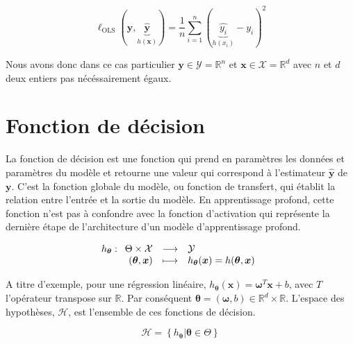 \begin{equation}
    \ell_{\text{OLS}}(\boldsymbol{y}, \underbrace{\hat{\boldsymbol{y}}}_{h(\boldsymbol{x})}) = \frac{1}{n}\sum_{i=1}^{n} (\underbrace{\hat{y_i}}_{h(x_i)} - y_i)^2 \nonumber
\end{equation}

\noindent Nous avons donc dans ce cas particulier $\boldsymbol{y} \in \mathcal{Y} = \mathbb{R}^{n}$ et $\boldsymbol{x} \in \mathcal{X} = \mathbb{R}^{d}$ avec $n$ et $d$ deux entiers pas nécéssairement égaux.

\section{Fonction de décision}

\noindent La fonction de décision est une fonction qui prend en paramètres les données et paramètres du modèle et retourne une valeur qui correspond à l'estimateur $\hat{\boldsymbol{y}}$ de $\boldsymbol{y}$. 
C'est la fonction globale du modèle, ou fonction de transfert, qui établit la relation entre l'entrée et la sortie du modèle. En apprentissage profond, cette fonction n'est pas à confondre avec la fonction 
d'activation qui représente la dernière étape de l'architecture d'un modèle d'apprentissage profond.

\begin{equation}
    h_{\boldsymbol{\theta}} : \begin{array}[t]{rcl} 
    \Theta \times \mathcal{X} & \longrightarrow & \mathcal{Y} \\ 
    (\boldsymbol{\theta}, \boldsymbol{x}) & \longmapsto & h_{\boldsymbol{\theta}}(\boldsymbol{x}) = h(\boldsymbol{\theta}, \boldsymbol{x})
    \end{array}
\end{equation} 

\vspace{1em}

\noindent A titre d'exemple, pour une régression linéaire, $h_{\boldsymbol{\theta}}(\boldsymbol{x}) = \boldsymbol{\omega}^T \boldsymbol{x} + b$, avec $T$ l'opérateur transpose sur $\mathbb{R}$. Par conséquent 
$\boldsymbol{\theta} = (\boldsymbol{\omega}, b) \in \mathbb{R}^d \times \mathbb{R}$. L'espace des hypothèses, $\mathcal{H}$, est l'ensemble de ces fonctions de décision.

\begin{equation}
    \mathcal{H} = \left\{ h_{\boldsymbol{\theta}} | \boldsymbol{\theta} \in \Theta \right\}
\end{equation}

